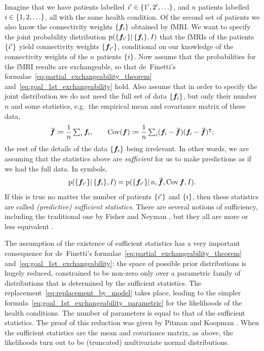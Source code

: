 \documentclass[%
]{frontiersSCNS-nologo} %
\newcommand*{\citey}{\citeyearpar}
\newcommand*{\sect}{\S} %
\newcommand*{\eg}{e.g.}
\newcommand*{\widebar}[1]{{\mkern1.5mu\skew{2}\overline{\mkern-1.5mu#1\mkern-1.5mu}\mkern 1.5mu}}
\newcommand*{\defd}{\coloneqq}%
\newcommand*{\pf}{\mathrm{p}}%
\renewcommand*{\|}{\mathpunct{|}}%
\let\oldsum\sum
\renewcommand*{\sum}{\mathop{\textstyle\oldsum}}
\newcommand*{\tsum}{\mathop{\textstyle\sum}\nolimits}
\DeclarePairedDelimiter\set{\{}{\}}%
\newcommand*{\T}{^\intercal}%
\newcommand*{\yxx}{f}
\newcommand*{\yx}{\bm{\yxx}}
\newcommand*{\yn}{n}
\newcommand*{\yI}{I}
\newcommand*{\av}{\widebar}
\DeclareMathOperator{\Cov}{Cov}%
\begin{document}
Imagine that we have patients labelled $i'\in\set{1',2',\dotsc}$, and $\yn$
patients labelled $i\in\set{1,2,\dotsc}$, all with the same health
condition. Of the second set of patients we also know the connectivity
weights $\set{\yx_i}$ obtained by fMRI. We want to specify the joint
probability distribution $\pf( \set{\yx_{i'}}\| \set{\yx_i}, \yI)$ that the
fMRIs of the patients $\set{i'}$ yield connectivity weights
$\set{\yx_{i'}}$, conditional on our knowledge of the connectivity weights
of the $\yn$ patients $\set{i}$. Now assume that the probabilities for the
fMRI results are exchangeable, so that de~Finetti's
formulae~\eqref{eq:partial_exchangeability_theorem}
and~\eqref{eq:goal_1st_exchangeability} hold. Also assume that in order to
specify the joint distribution we do not need the full set of data
$\set{\yx_i}$, but only their number $\yn$ and some statistics, \eg\ the
empirical mean and covariance matrix of these data,
\begin{equation}
  \label{eq:example_suff_stat}
  \av{\yx} \defd\frac{1}{\yn}\tsum_i \yx_i, \qquad
  \Cov(\yx) \defd \frac{1}{\yn}\tsum_i(\yx_i-\av{\yx})(\yx_i-\av{\yx})\T;
\end{equation}
the rest of the details of the data $\set{\yx_i}$ being irrelevant. In
other words, we are assuming that the statistics above are
\emph{sufficient} for us to make predictions as if we had the full data. In
symbols,
\begin{equation}
  \label{eq:sufficiency_example}
  \pf( \set{\yx_{i'}}\|  \set{\yx_i}, \yI)
  = 
  \pf(\set{\yx_{i'}} \|  \yn, \av{\yx}, \Cov{\yx}, \yI).
\end{equation}
If this is true no matter the number of patients $\set{i'}$ and $\set{i}$,
then these statistics are called \emph{(predictive) sufficient statistics}.
There are several notions of sufficiency, including the traditional one by
Fisher \citey{fisher1922} and Neyman \citey{neyman1935}, but they all are
more or less equivalent \citep[\sect~4.5.2]{bernardoetal1994_r2000}.

The assumption of the existence of sufficient statistics has a very
important consequence for de~Finetti's
formulae~\eqref{eq:partial_exchangeability_theorem}
and~\eqref{eq:goal_1st_exchangeability}: the space of possible prior
distributions is hugely reduced, constrained to be non-zero only over a
parametric family of distributions that is determined by the sufficient
statistics. The replacement~\eqref{eq:replacement_by_model} takes place,
leading to the simpler
formula~\eqref{eq:goal_1st_exchangeability_parametric} for the likelihoods
of the health conditions. The number of parameters is equal to that of the
sufficient statistics. The proof of this reduction was given by Pitman and
Koopman \citetext{\citealp{koopman1936,pitman1936,darmois1935}; for
  generalizations, \eg\ to the discrete case, see
  \citealp{hipp1974,andersen1970,denny1967,fraser1963,barankinetal1963}}.
When the sufficient statistics are the mean and covariance matrix, as
above, the likelihoods turn out to be (truncated) multivariate normal
distributions.
\end{document}
